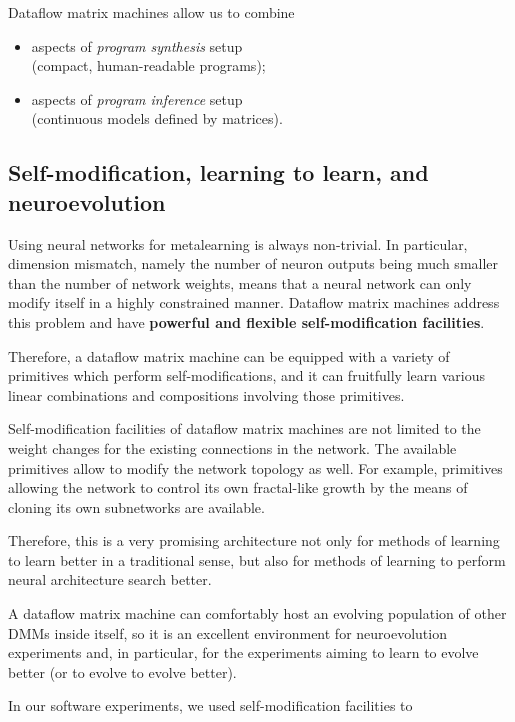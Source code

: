 \documentclass{article}
\begin{document}
\vspace{0.1in}
\noindent
Dataflow matrix machines allow us  to combine

  \begin{itemize}
      \item aspects of {\em program synthesis} setup\\ (compact, human-readable programs);
      \item aspects of {\em program inference} setup\\ (continuous models defined by matrices).
  \end{itemize}

\subsection{Self-modification, learning to learn, and neuroevolution} \label{sec:selfref}

Using neural networks for metalearning
is always non-trivial. In particular, dimension mismatch, namely the number of neuron outputs 
being much smaller than the number of network weights,
means that a neural network
can only modify itself in a highly constrained manner. Dataflow matrix machines address
this problem and have {\bf powerful and flexible self-modification facilities}.

Therefore, a dataflow matrix machine can be equipped with a variety of primitives
which perform self-modifications, and it can fruitfully learn various linear combinations and
compositions involving those primitives.

Self-modification facilities of dataflow matrix machines are not limited to the weight
changes for the existing connections in the network. The available primitives allow to
modify the network topology as well. For example, primitives allowing the network
to control its own fractal-like growth by the means of cloning its own subnetworks
are available.

Therefore, this is a very promising architecture not only for methods of learning to learn
better in a traditional sense, but also for methods of learning to perform
neural architecture search better. 

A dataflow matrix machine can comfortably host
an evolving population of other DMMs inside itself, so it is
an excellent environment for neuroevolution experiments and, in particular,
for the experiments aiming to learn to evolve better (or to evolve to evolve better).

\vspace{0.1in}
\noindent
In our software experiments, we used self-modification facilities to
\end{document}
